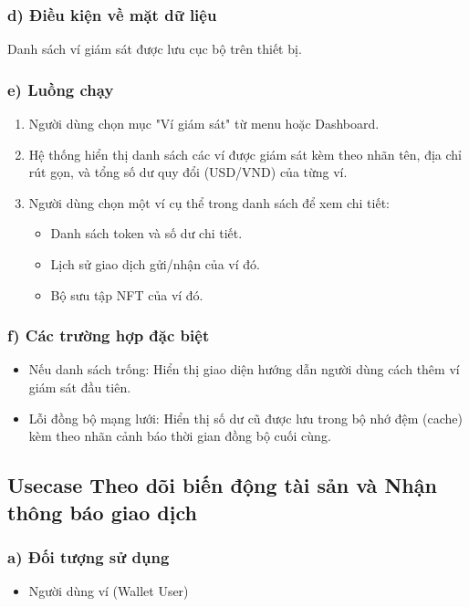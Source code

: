 \documentclass[a4paper]{report}
\begin{document}
\subsubsection{d) Điều kiện về mặt dữ liệu}
Danh sách ví giám sát được lưu cục bộ trên thiết bị.

\subsubsection{e) Luồng chạy}
\begin{enumerate}
    \item Người dùng chọn mục "Ví giám sát" từ menu hoặc Dashboard.
    \item Hệ thống hiển thị danh sách các ví được giám sát kèm theo nhãn tên, địa chỉ rút gọn, và tổng số dư quy đổi (USD/VND) của từng ví.
    \item Người dùng chọn một ví cụ thể trong danh sách để xem chi tiết:
    \begin{itemize}
        \item Danh sách token và số dư chi tiết.
        \item Lịch sử giao dịch gửi/nhận của ví đó.
        \item Bộ sưu tập NFT của ví đó.
    \end{itemize}
\end{enumerate}

\subsubsection{f) Các trường hợp đặc biệt}
\begin{itemize}
    \item Nếu danh sách trống: Hiển thị giao diện hướng dẫn người dùng cách thêm ví giám sát đầu tiên.
    \item Lỗi đồng bộ mạng lưới: Hiển thị số dư cũ được lưu trong bộ nhớ đệm (cache) kèm theo nhãn cảnh báo thời gian đồng bộ cuối cùng.
\end{itemize}

\subsection{Usecase Theo dõi biến động tài sản và Nhận thông báo giao dịch}

\subsubsection{a) Đối tượng sử dụng}
\begin{itemize}
    \item Người dùng ví (Wallet User)
\end{itemize}
\end{document}
